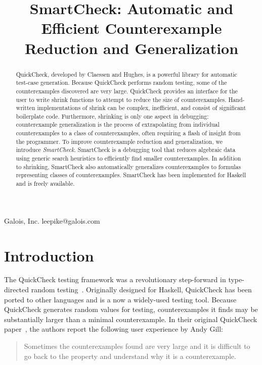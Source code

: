 \documentclass{sigplanconf}
\begin{document}


\title{SmartCheck: Automatic and Efficient Counterexample Reduction and Generalization}

           {Galois, Inc.}
           {leepike@galois.com}
\maketitle

\begin{abstract}
QuickCheck, developed by Claessen and Hughes, is a powerful library for
automatic test-case generation.  Because QuickCheck performs random testing,
some of the counterexamples discovered are very large.  QuickCheck provides an
interface for the user to write shrink functions to attempt to reduce the size
of counterexamples.  Hand-written implementations of shrink can be complex,
inefficient, and consist of significant boilerplate code.  Furthermore,
shrinking is only one aspect in debugging: counterexample generalization is the
process of extrapolating from individual counterexamples to a class of
counterexamples, often requiring a flash of insight from the programmer.  To
improve counterexample reduction and generalization, we introduce
\emph{SmartCheck}.  SmartCheck is a debugging tool that reduces algebraic data
using generic search heuristics to efficiently find smaller counterexamples.  In
addition to shrinking, SmartCheck also automatically generalizes counterexamples
to formulas representing classes of counterexamples.  SmartCheck has been implemented for Haskell and is freely available.
\end{abstract}




\section{Introduction}\label{sec:intro}
The QuickCheck testing framework was a revolutionary step-forward in
type-directed random testing~\cite{qc,monadic}.  Originally designed for Haskell,
QuickCheck has been ported to other languages and is a now a widely-used testing
tool.  Because QuickCheck generates random values for testing, counterexamples
it finds may be substantially larger than a minimal counterexample.  In their
original QuickCheck paper~\cite{qc}, the authors report the following user
experience by Andy Gill:
%
\begin{quote}
Sometimes the counterexamples found are very large and it is difficult to go
back to the property and understand why it is a counterexample.
\end{quote}
\end{document}
